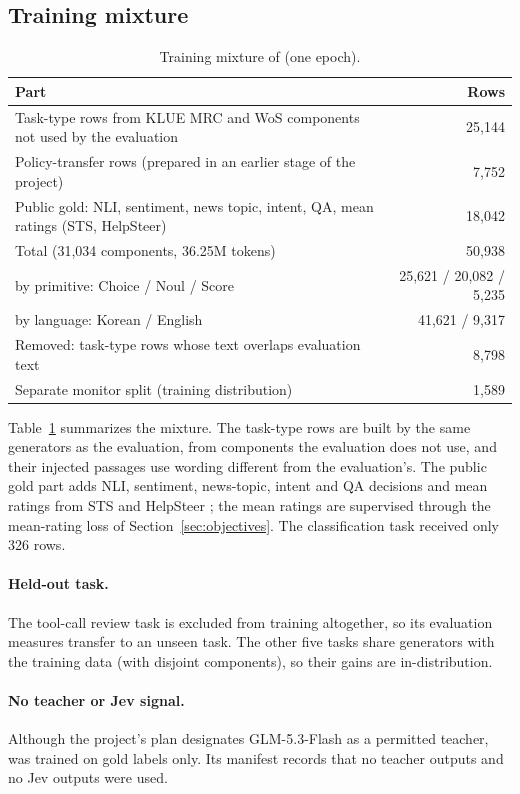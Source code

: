 \subsection{Training mixture}
\label{sec:mixture}

\begin{table}[t]
\centering
\small
\caption{Training mixture of \expone{} (one epoch).}
\label{tab:mixture}
\begin{tabular}{@{}p{10.8cm}r@{}}
\toprule
Part & Rows \\
\midrule
Task-type rows from KLUE MRC and WoS components not used by the evaluation & 25,144 \\
Policy-transfer rows (prepared in an earlier stage of the project) & 7,752 \\
Public gold: NLI, sentiment, news topic, intent, QA, mean ratings (STS, HelpSteer) & 18,042 \\
\midrule
Total (31,034 components, 36.25M tokens) & 50,938 \\
\quad by primitive: Choice / Noul / Score & 25,621 / 20,082 / 5,235 \\
\quad by language: Korean / English & 41,621 / 9,317 \\
\midrule
Removed: task-type rows whose text overlaps evaluation text & 8,798 \\
Separate monitor split (training distribution) & 1,589 \\
\bottomrule
\end{tabular}
\end{table}

Table~\ref{tab:mixture} summarizes the mixture. The task-type rows are built by the same
generators as the evaluation, from components the evaluation does not use, and their
injected passages use wording different from the evaluation's. The public gold part adds
NLI, sentiment, news-topic, intent and QA decisions and mean ratings from STS and HelpSteer
\citep{wang2023helpsteer}; the mean ratings are supervised through the mean-rating loss of
Section~\ref{sec:objectives}. The classification task received only 326 rows.

\paragraph{Held-out task.}
The tool-call review task is excluded from training altogether, so its evaluation measures
transfer to an unseen task. The other five tasks share generators with the training data
(with disjoint components), so their gains are in-distribution.

\paragraph{No teacher or Jev signal.}
Although the project's plan designates GLM-5.3-Flash as a permitted teacher, \expone{} was
trained on gold labels only. Its manifest records that no teacher outputs and no Jev outputs
were used.
